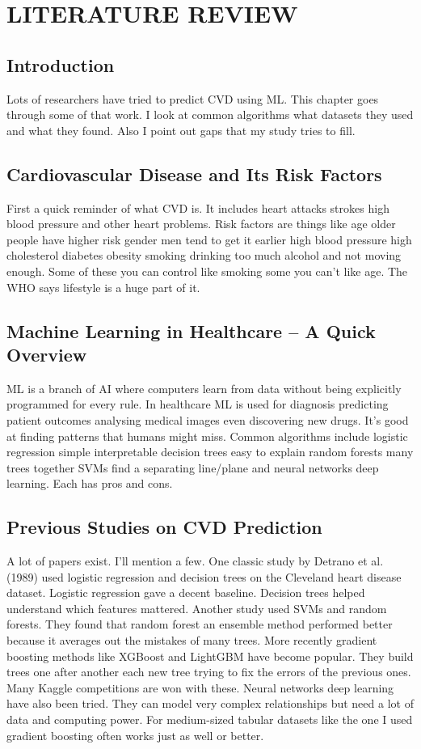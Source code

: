 \documentclass[12pt, a4paper, oneside]{book}
\begin{document}
\chapter{LITERATURE REVIEW}

\section{Introduction}
Lots of researchers have tried to predict CVD using ML. This chapter goes through some of that work. I look at common algorithms what datasets they used and what they found. Also I point out gaps that my study tries to fill.

\section{Cardiovascular Disease and Its Risk Factors}
First a quick reminder of what CVD is. It includes heart attacks strokes high blood pressure and other heart problems. Risk factors are things like age older people have higher risk gender men tend to get it earlier high blood pressure high cholesterol diabetes obesity smoking drinking too much alcohol and not moving enough. Some of these you can control like smoking some you can't like age. The WHO says lifestyle is a huge part of it.

\section{Machine Learning in Healthcare -- A Quick Overview}
ML is a branch of AI where computers learn from data without being explicitly programmed for every rule. In healthcare ML is used for diagnosis predicting patient outcomes analysing medical images even discovering new drugs. It's good at finding patterns that humans might miss. Common algorithms include logistic regression simple interpretable decision trees easy to explain random forests many trees together SVMs find a separating line/plane and neural networks deep learning. Each has pros and cons.

\section{Previous Studies on CVD Prediction}
A lot of papers exist. I'll mention a few.
One classic study by Detrano et al. (1989) used logistic regression and decision trees on the Cleveland heart disease dataset. Logistic regression gave a decent baseline. Decision trees helped understand which features mattered.
Another study used SVMs and random forests. They found that random forest an ensemble method performed better because it averages out the mistakes of many trees.
More recently gradient boosting methods like XGBoost and LightGBM have become popular. They build trees one after another each new tree trying to fix the errors of the previous ones. Many Kaggle competitions are won with these.
Neural networks deep learning have also been tried. They can model very complex relationships but need a lot of data and computing power. For medium-sized tabular datasets like the one I used gradient boosting often works just as well or better.
\end{document}
